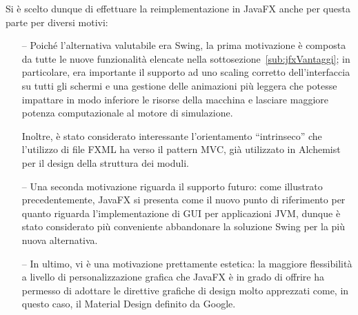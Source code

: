         Si è scelto dunque di effettuare la reimplementazione in JavaFX anche per questa parte per diversi motivi:

        \begin{itemize}
            \item[--] Poiché l'alternativa valutabile era Swing, la prima motivazione è composta da tutte le nuove funzionalità elencate nella sottosezione~\ref{sub:jfxVantaggi}; in particolare, era importante il supporto ad uno scaling corretto dell'interfaccia su tutti gli schermi e una gestione delle animazioni più leggera che potesse impattare in modo inferiore le risorse della macchina e lasciare maggiore potenza computazionale al motore di simulazione.

            Inoltre, è stato considerato interessante l'orientamento ``intrinseco'' che l'utilizzo di file FXML ha verso il pattern MVC, già utilizzato in Alchemist per il design della struttura dei moduli.

            \item[--] Una seconda motivazione riguarda il supporto futuro: come illustrato precedentemente, JavaFX si presenta come il nuovo punto di riferimento per quanto riguarda l'implementazione di GUI per applicazioni JVM, dunque è stato considerato più conveniente abbandonare la soluzione  Swing per la più nuova alternativa.

            \item[--] In ultimo, vi è una motivazione prettamente estetica: la maggiore flessibilità a livello di personalizzazione grafica che JavaFX è in grado di offrire ha permesso di adottare le direttive grafiche di design molto apprezzati come, in questo caso, il Material Design definito da Google.
        \end{itemize}
